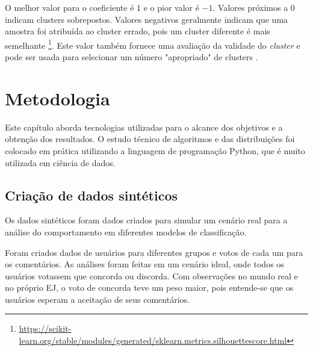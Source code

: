 O melhor valor para o coeficiente é $1$ e o pior valor é $-1$. Valores próximos a $0$ indicam clusters sobrepostos. Valores negativos geralmente indicam que uma amostra foi atribuída ao cluster errado, pois um cluster diferente é mais semelhante 
\footnote{\href{https://scikit-learn.org/stable/modules/generated/sklearn.metrics.silhouette_score.html}{https://scikit-learn.org/stable/modules/generated/sklearn.metrics.silhouette\underline{\space}score.html}}.
Este valor também fornece uma avaliação da validade do \textit{cluster} e pode ser usada para selecionar um número "apropriado" de clusters \cite{rousseeuw1987}.







\chapter{Metodologia}
\label{chap:4}


Este capítulo aborda tecnologias utilizadas para o alcance dos objetivos e a obtenção dos resultados. O estudo técnico de algoritmos e das distribuições foi colocado em prática utilizando a linguagem de programação Python, que é muito utilizada em ciência de dados.


\section{Criação de dados sintéticos}

Os dados sintéticos foram dados criados para simular um cenário real para a análise do comportamento em diferentes modelos de classificação.

Foram criados dados de usuários para diferentes grupos e votos de cada um para os comentários. As análises foram feitas em um cenário ideal, onde todos os usuários votassem que concorda ou discorda. Com observações no mundo real e no próprio EJ, o voto de concorda teve um peso maior, pois entende-se que os usuários esperam a aceitação de seus comentários.

